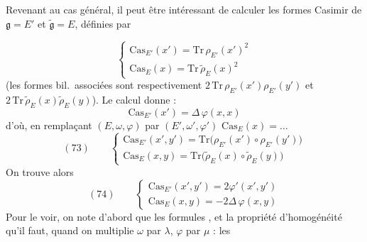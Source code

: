 \documentclass[11pt,a4paper]{article}
\begin{document}
Revenant au cas général, il peut être intéressant de calculer les formes
  Casimir de $\mathfrak{g} = E'$ et
$\widetilde{\mathfrak{g}} = E$, définies par

\[
  \begin{cases}
    \mathrm{Cas}_{E'}(x') = \mathrm{Tr}\, \rho_{E'}(x')^2 \\
    \mathrm{Cas}_{E}(x) = \mathrm{Tr}\, \tilde{\rho}_{E}(x)^2
  \end{cases}
\]
(les formes bil.\ associées sont respectivement
$2\,\mathrm{Tr}\, \rho_{E'}(x')\rho_{E'}(y')$ et
$2\,\mathrm{Tr}\, \tilde{\rho}_E(x)\tilde{\rho}_E(y)$).
Le calcul donne :
\[
  \mathrm{Cas}_{E'}(x') = \Delta\, \varphi(x, x)
\]
d'où, en remplaçant $(E, \omega, \varphi)$ par $(E', \omega', \varphi')$
 $\mathrm{Cas}_{E}(x) = \ldots$
\[
  (73) \qquad
  \begin{cases}
    \mathrm{Cas}_{E'}(x', y') = \mathrm{Tr}\bigl(\rho_{E'}(x') \circ \rho_{E'}(y')\bigr) \\
    \mathrm{Cas}_{E}(x, y) = \mathrm{Tr}\bigl(\tilde{\rho}_{E}(x) \circ \tilde{\rho}_{E}(y)\bigr)
  \end{cases}
\]
On trouve alors
\[
  (74) \qquad
  \begin{cases}
    \mathrm{Cas}_{E'}(x', y') = 2\varphi'(x', y') \\
    \mathrm{Cas}_{E}(x, y) = -2\Delta\, \varphi(x, y)
  \end{cases}
\]
Pour le voir, on note d'abord que les \add{\ill{}} formules \ill{}, et la
propriété d'homogénéité qu'il faut, quand on multiplie $\omega$ par
$\lambda$, $\varphi$ par $\mu$ : les
\end{document}
